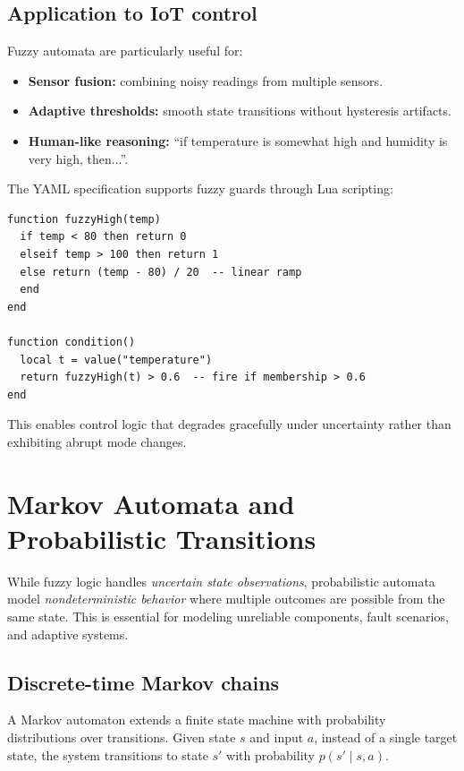 \subsection{Application to IoT control}

Fuzzy automata are particularly useful for:
\begin{itemize}
  \item \textbf{Sensor fusion:} combining noisy readings from multiple sensors.
  \item \textbf{Adaptive thresholds:} smooth state transitions without hysteresis artifacts.
  \item \textbf{Human-like reasoning:} ``if temperature is somewhat high and humidity is very high, then...''.
\end{itemize}

The YAML specification supports fuzzy guards through Lua scripting:
\begin{verbatim}
function fuzzyHigh(temp)
  if temp < 80 then return 0
  elseif temp > 100 then return 1
  else return (temp - 80) / 20  -- linear ramp
  end
end

function condition()
  local t = value("temperature")
  return fuzzyHigh(t) > 0.6  -- fire if membership > 0.6
end
\end{verbatim}

This enables control logic that degrades gracefully under uncertainty rather than exhibiting abrupt mode changes.

\section{Markov Automata and Probabilistic Transitions}

While fuzzy logic handles \emph{uncertain state observations}, probabilistic automata model \emph{nondeterministic behavior} where multiple outcomes are possible from the same state.
This is essential for modeling unreliable components, fault scenarios, and adaptive systems.

\subsection{Discrete-time Markov chains}

A Markov automaton extends a finite state machine with probability distributions over transitions.
Given state $s$ and input $a$, instead of a single target state, the system transitions to state $s'$ with probability $p(s' \mid s, a)$.

